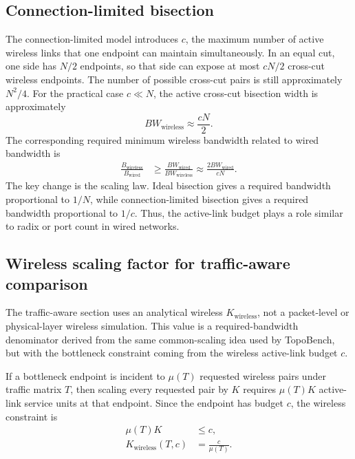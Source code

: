 \documentclass[conference]{IEEEtran}
\begin{document}
\subsection{Connection-limited bisection}

The connection-limited model introduces \(c\), the maximum number of active wireless links that one endpoint can maintain simultaneously. In an equal cut, one side has \(N/2\) endpoints, so that side can expose at most \(cN/2\) cross-cut wireless endpoints. The number of possible cross-cut pairs is still approximately \(N^2/4\). For the practical case \(c \ll N\), the active cross-cut bisection width is approximately
\begin{equation}
BW_{\mathrm{wireless}} \approx \frac{cN}{2}.
\end{equation}
The corresponding required minimum wireless bandwidth related to wired bandwidth is
\begin{align}
\frac{B_{\mathrm{wireless}}}{B_{\mathrm{wired}}}
&\ge
\frac{BW_{\mathrm{wired}}}{BW_{\mathrm{wireless}}}
\approx
\frac{2BW_{\mathrm{wired}}}{cN}.
\end{align}
The key change is the scaling law. Ideal bisection gives a required bandwidth proportional to \(1/N\), while connection-limited bisection gives a required bandwidth proportional to \(1/c\). Thus, the active-link budget plays a role similar to radix or port count in wired networks.

\subsection{Wireless scaling factor for traffic-aware comparison}

The traffic-aware section uses an analytical wireless \(K_{\mathrm{wireless}}\), not a packet-level or physical-layer wireless simulation. This value is a required-bandwidth denominator derived from the same common-scaling idea used by TopoBench, but with the bottleneck constraint coming from the wireless active-link budget \(c\).

If a bottleneck endpoint is incident to \(\mu(T)\) requested wireless pairs under traffic matrix \(T\), then scaling every requested pair by \(K\) requires \(\mu(T)K\) active-link service units at that endpoint. Since the endpoint has budget \(c\), the wireless constraint is
\begin{align}
\mu(T)K &\le c, \\
K_{\mathrm{wireless}}(T,c) &= \frac{c}{\mu(T)}.
\end{align}
\end{document}
